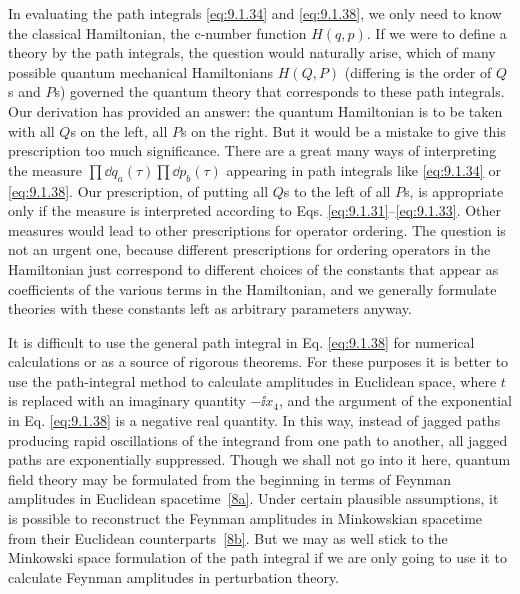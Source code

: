 In evaluating the path integrals \eqref{eq:9.1.34} and \eqref{eq:9.1.38}, we only need to know
the classical Hamiltonian, the c-number function $H(q,p)$. If we were to
define a theory by the path integrals, the question would naturally arise,
which of many possible quantum mechanical Hamiltonians $H(Q,P)$
(differing is the order of $Q$s and $P$s) governed the quantum theory that
corresponds to these path integrals. Our derivation has provided an answer:
the quantum Hamiltonian is to be taken with all $Q$s on the left, all $P$s
on the right. But it would be a mistake to give this prescription too much
significance. There are a great many ways of interpreting the measure
$\prod \dd q_a(\tau)\prod \dd p_b(\tau)$ appearing in path integrals like
\eqref{eq:9.1.34} or \eqref{eq:9.1.38}. Our prescription, of putting all $Q$s to the left of all
$P$s, is appropriate only if the measure is interpreted according to
Eqs. \eqref{eq:9.1.31}--\eqref{eq:9.1.33}. Other measures would lead to other prescriptions
for operator ordering. The question is not an urgent one, because different
prescriptions for ordering operators in the Hamiltonian just correspond to
different choices of the constants that appear as coefficients of the various
terms in the Hamiltonian, and we generally formulate theories with these
constants left as arbitrary parameters anyway.

It is difficult to use the general path integral in Eq. \eqref{eq:9.1.38} for numerical
calculations or as a source of rigorous theorems. For these purposes it is
better to use the path-integral method to calculate amplitudes in Euclidean
space, where $t$ is replaced with an imaginary quantity $-\ii x_4$, and the
argument of the exponential in Eq. \eqref{eq:9.1.38} is a negative real quantity. In
this way, instead of jagged paths producing rapid oscillations of the
integrand from one path to another, all jagged paths are exponentially
suppressed. Though we shall not go into it here, quantum field theory may
be formulated from the beginning in terms of Feynman amplitudes in
Euclidean spacetime~\hyperref[ref:9.8a]{[8a]}. Under certain plausible assumptions, it is possible
to reconstruct the Feynman amplitudes in Minkowskian spacetime from their
Euclidean counterparts~\hyperref[ref:9.8b]{[8b]}. But we may as well stick to the Minkowski
space formulation of the path integral if we are only going to use it to
calculate Feynman amplitudes in perturbation theory.
